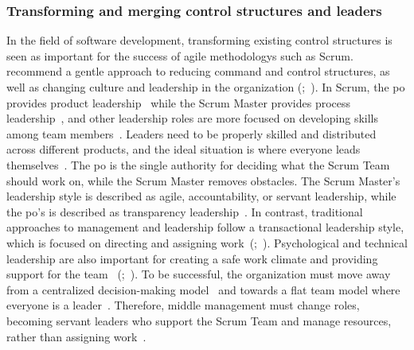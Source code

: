 \subsubsection*{Transforming and merging control structures and leaders}\label{subsubsec:TransformingManagement}
In the field of software development, transforming existing control structures is seen as important for the success of \gls{agile} \glspl{methodology} such as Scrum.  recommend a gentle approach to reducing command and control structures, as well as changing culture and leadership in the organization (;~). In Scrum, the \ac{po} provides product leadership~\cite[p.~15]{Rubin2012ESA} while the Scrum Master provides process leadership~\cite[p.~16]{Rubin2012ESA}, and other leadership roles are more focused on developing skills among team members~\cite[p.~56]{Alami2022HSa}. Leaders need to be properly skilled and distributed across different products, and the ideal situation is where everyone leads themselves~\cite[p.~39]{Moreira2013AtA}. The \ac{po} is the single authority for deciding what the Scrum Team should work on, while the Scrum Master removes obstacles. The Scrum Master's leadership style is described as \gls{agile}, accountability, or servant leadership, while the \ac{po}'s is described as transparency leadership~\cite[p.~56]{Alami2022HSa}. In contrast, traditional approaches to management and leadership follow a transactional leadership style, which is focused on directing and assigning work~(;~). Psychological and technical leadership are also important for creating a safe work climate and providing support for the team ~(;~). To be successful, the organization must move away from a centralized decision-making model~\cite[p.~152]{mancl2019xp} and towards a flat team model where everyone is a leader~\cite[p.~129]{Moreira2013AtA}. Therefore, middle management must change roles, becoming servant leaders who support the Scrum Team and manage resources, rather than assigning work~\cite[p.~125]{Moreira2013AtA}.

